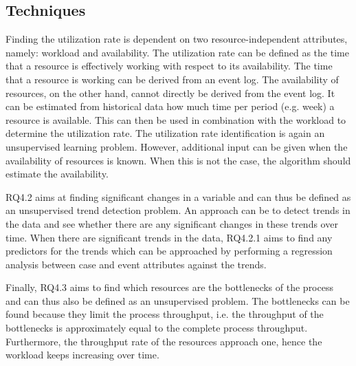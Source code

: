\subsection{Techniques}
Finding the utilization rate is dependent on two resource-independent attributes, namely: workload and availability. The utilization rate can be defined as the time that a resource is effectively working with respect to its availability. The time that a resource is working can be derived from an event log. The availability of resources, on the other hand, cannot directly be derived from the event log. It can be estimated from historical data how much time per period (e.g. week) a resource is available. This can then be used in combination with the workload to determine the utilization rate. The utilization rate identification is again an unsupervised learning problem. However, additional input can be given when the availability of resources is known. When this is not the case, the algorithm should estimate the availability. 

RQ4.2 aims at finding significant changes in a variable and can thus be defined as an unsupervised trend detection problem. An approach can be to detect trends in the data and see whether there are any significant changes in these trends over time. When there are significant trends in the data, RQ4.2.1 aims to find any predictors for the trends which can be approached by performing a regression analysis between case and event attributes against the trends. 

Finally, RQ4.3 aims to find which resources are the bottlenecks of the process and can thus also be defined as an unsupervised problem. The bottlenecks can be found because they limit the process throughput, i.e. the throughput of the bottlenecks is approximately equal to the complete process throughput. Furthermore, the throughput rate of the resources approach one, hence the workload keeps increasing over time. 



